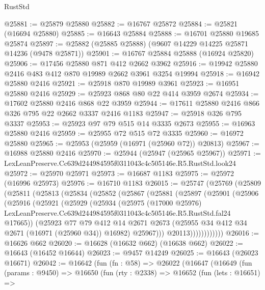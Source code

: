 \begin{lexlean}{RustStd}
\begin{coremodule}
@25881 := @25879 @25880
@25882 := @16767 @25872
@25884 := @25821 (@16694 @25880)
@25885 := @16643 @25884
@25888 := @16701 @25880 @19685 @25874
@25897 := @25882 (@25885 @25888) (@9607 @14229 @14225 @25871 @14236 (@9478 @25871))
@25901 := @16767 @25884 @25888 (@16924 @25820)
@25906 := @17456 @25880 @871 @412 @2662 @3962
@25916 := @19942 @25880 @2416 @483 @412 @870 @19989 @2662 @3961 @3254 @19994
@25918 := @16942 @25880 @2416
@25921 := @25918 @870 @19989 @3961
@25923 := @16951 @25880 @2416
@25929 := @25923 @868 @80 @22 @414 @3959 @2674
@25934 := @17602 @25880 @2416 @868 @22 @3959
@25944 := @17611 @25880 @2416 @866 @326 @795 @22 @2662 @3337 @2416 @1183
@25947 := @25918 @326 @795 @3337
@25953 := @25923 @97 @79 @515 @14 @3335 @2673
@25955 := @16963 @25880 @2416
@25959 := @25955 @72 @515 @72 @3335
@25960 := @16972 @25880
@25965 := @25953 (@25959 (@16971 (@25960 @72)) @20813)
@25967 := @16988 @25880 @2416
@25970 := @25944 (@25947 (@25965 @25967))
@25971 := LexLeanPreserve.Cc639d244984595f0311043c4c505146e.R5.RustStd.look24
@25972 := @25970 @25971
@25973 := @16687 @1183
@25975 := @25972 (@16996 @25973)
@25976 := @16710 @1183
@26015 := @25747
    (@25769
      (@25809
        (@25811
          (@25813
            (@25834
              (@25852
                (@25867
                  (@25881
                    (@25897
                      (@25901
                        (@25906
                          (@25916
                            (@25921
                              (@25929
                                (@25934
                                  (@25975
                                    (@17000 @25976)
                                    LexLeanPreserve.Cc639d244984595f0311043c4c505146e.R5.RustStd.fal24
                                    @17665))
                                (@25923
                                  @77
                                  @79
                                  @412
                                  @14
                                  @2671
                                  @2673
                                  (@25955 @34 @412 @34 @2671 (@16971 (@25960 @34)) @16982)
                                  @25967)))
                            @20113))))))))))))
@26016 := @16626 @662
@26020 := @16628 (@16632 @662) (@16638 @662)
@26022 := @16643 (@16452 @16644)
@26023 := @9457 @14249
@26025 := @16643 (@26023 @16671)
@26042 := @16642
    (fun (fn : @58) =>
    @26022
      (@16647
        (@16649
          (fun (params : @9450) =>
          @16650
            (fun (rty : @2338) =>
            @16652
              (fun (lets : @16651) =>

\end{coremodule}
\end{lexlean}
